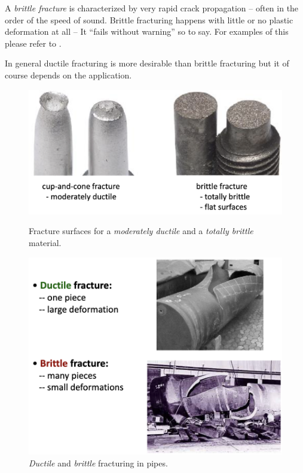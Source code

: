 \begin{definition}
  A \textit{brittle fracture} is characterized by very rapid crack propagation -- often in the order of the speed of sound. Brittle fracturing happens with little or no plastic deformation at all -- It ``fails without warning'' so to say. For examples of this please refer to \textbf{}.
\end{definition}
In general ductile fracturing is more desirable than brittle fracturing but it of course depends on the application.
\begin{figure}[ht]
  \centering
  \begin{minipage}{0.58\linewidth}
    \centering
    \includegraphics[width=\linewidth]{./figures/f9_2.png}
    \caption{Fracture surfaces for a \textit{moderately ductile} and a \textit{totally brittle} material.}
    \label{fig:f9_2}
  \end{minipage}
  \hfill
  \begin{minipage}{0.38\linewidth}
    \centering
    \includegraphics[width=\linewidth]{./figures/f9_3.png}
    \caption{\textit{Ductile} and \textit{brittle} fracturing in pipes.}
    \label{fig:f9_3}
  \end{minipage}
\end{figure}


